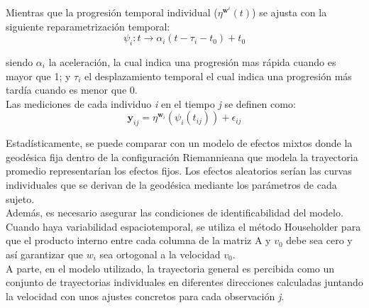 	Mientras que la progresión temporal individual ($\eta^{\textbf{w}^{i}}(t)$) se ajusta con la siguiente reparametrización temporal:
	\begin{equation}
		\psi_i:t \rightarrow \alpha_i(t - \tau_i - t_0) + t_0
	\end{equation}
	
	siendo $\alpha_i$ la aceleración, la cual indica una progresión mas rápida cuando es mayor que 1; y $\tau_{i}$ el desplazamiento temporal el cual indica una progresión más tardía cuando es menor que 0.\\
	
	Las mediciones de cada individuo \textit{i} en el tiempo \textit{j} se definen como:
	\begin{equation}
		\textbf{y}_{ij}=\eta^{\textbf{w}_{i}}(\psi_{i}(t_{ij}))+\epsilon_{ij}
	\end{equation}
	
	Estadísticamente, se puede comparar con un modelo de efectos mixtos donde la geodésica fija dentro de la configuración Riemannieana que modela la trayectoria promedio representarían los efectos fijos. Los efectos aleatorios serían las curvas individuales que se derivan de la geodésica mediante los parámetros de cada sujeto.\\
	
	Además, es necesario asegurar las condiciones de identificabilidad del modelo. Cuando haya variabilidad espaciotemporal, se utiliza el método Householder para que el producto interno entre cada columna de la matriz A y $v_{0}$ debe sea cero y así garantizar que $\textit{w}_{i}$ sea ortogonal a la velocidad $v_{0}$.\\
	
	A parte, en el modelo utilizado, la trayectoria general es percibida como un conjunto de trayectorias individuales en diferentes direcciones calculadas juntando la velocidad con unos ajustes concretos para cada observación \textit{j}.\\
	
